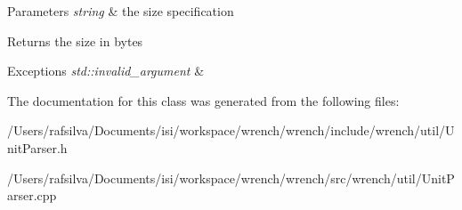 \begin{DoxyParams}{Parameters}
{\em string} & the size specification \\
\hline
\end{DoxyParams}
\begin{DoxyReturn}{Returns}
the size in bytes
\end{DoxyReturn}

\begin{DoxyExceptions}{Exceptions}
{\em std\+::invalid\+\_\+argument} & \\
\hline
\end{DoxyExceptions}


The documentation for this class was generated from the following files\+:\begin{DoxyCompactItemize}
\item 
/\+Users/rafsilva/\+Documents/isi/workspace/wrench/wrench/include/wrench/util/Unit\+Parser.\+h\item 
/\+Users/rafsilva/\+Documents/isi/workspace/wrench/wrench/src/wrench/util/Unit\+Parser.\+cpp\end{DoxyCompactItemize}
